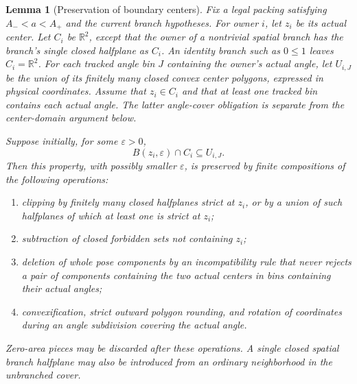 \documentclass[11pt]{article}
\newtheorem{lemma}[theorem]{Lemma}
\begin{document}
\begin{lemma}[Preservation of boundary centers]
\label{hybrid:boundary-neighborhood}
Fix a legal packing satisfying $A_-<a<A_+$ and the current branch
hypotheses. For owner $i$, let $z_i$ be its actual center. Let $C_i$ be
$\mathbb R^2$, except that the owner of a nontrivial spatial branch has
the branch's single closed halfplane as $C_i$. An identity branch such
as $0\le1$ leaves $C_i=\mathbb R^2$. For each tracked angle bin $J$ containing
the owner's actual angle, let $U_{i,J}$ be the union of its finitely many
closed convex center polygons, expressed in physical coordinates.
Assume that $z_i\in C_i$ and that at least one tracked bin contains each
actual angle.
The latter angle-cover obligation is separate from the center-domain
argument below.

Suppose initially, for some $\varepsilon>0$,
\begin{equation}
 B(z_i,\varepsilon)\cap C_i\subseteq U_{i,J}.
 \label{hybrid:relative-neighborhood}
\end{equation}
Then this property, with possibly smaller $\varepsilon$, is preserved by
finite compositions of the following operations:
\begin{enumerate}
\item clipping by finitely many closed halfplanes strict at $z_i$, or
by a union of such halfplanes of which at least one is strict at $z_i$;
\item subtraction of closed forbidden sets not containing $z_i$;
\item deletion of whole pose components by an incompatibility rule
that never rejects a pair of components containing the two actual
centers in bins containing their actual angles;
\item convexification, strict outward polygon rounding, and rotation of
coordinates during an angle subdivision covering the actual angle.
\end{enumerate}
Zero-area pieces may be discarded after these operations. A single closed
spatial branch halfplane may also be introduced from an ordinary
neighborhood in the unbranched cover.
\end{lemma}
\end{document}
